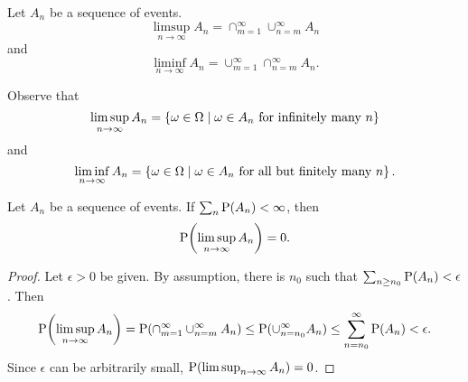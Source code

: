 \begin{definition}
    Let $A_n$ be a sequence of events. 
    \begin{equation*}
        \limsup_{n\to\infty} A_n = \cap_{m=1}^\infty\cup_{n=m}^\infty A_n
    \end{equation*}
    and 
    \begin{equation*}
        \liminf_{n\to\infty} A_n = \cup_{m=1}^\infty\cap_{n=m}^\infty A_n. 
    \end{equation*}
\end{definition}
\begin{remark}
    Observe that 
    \begin{equation*}
        \limsup_{n\to\infty} A_n 
        = \Set{\omega\in\Omega}{\omega\in A_n\text{ for infinitely many $n$}} 
    \end{equation*}
    and 
    \begin{equation*}
        \liminf_{n\to\infty}A_n 
        = \Set{\omega\in\Omega}{\omega\in A_n\text{ for all but finitely many $n$}}. 
    \end{equation*}
\end{remark}

\begin{theorem}
    Let $A_n$ be a sequence of events. If $\sum_n \P(A_n)<\infty$, then 
    \begin{equation*}
        \P\pth{\limsup_{n\to\infty}A_n} = 0.
    \end{equation*}
\end{theorem}
\begin{proof}
    Let $\epsilon>0$ be given. By assumption, there is $n_0$ such that 
    $\sum_{n\geq n_0}\P(A_n)<\epsilon$. Then 
    \begin{equation*}
        \P\pth{\limsup_{n\to\infty}A_n} = \P(\cap_{m=1}^\infty\cup_{n=m}^\infty A_n) 
        \leq \P(\cup_{n=n_0}^\infty A_n)\leq \sum_{n=n_0}^\infty \P(A_n)<\epsilon. 
    \end{equation*}
    Since $\epsilon$ can be arbitrarily small, $\P\pth{\limsup_{n\to\infty}A_n} = 0$. 
\end{proof}

